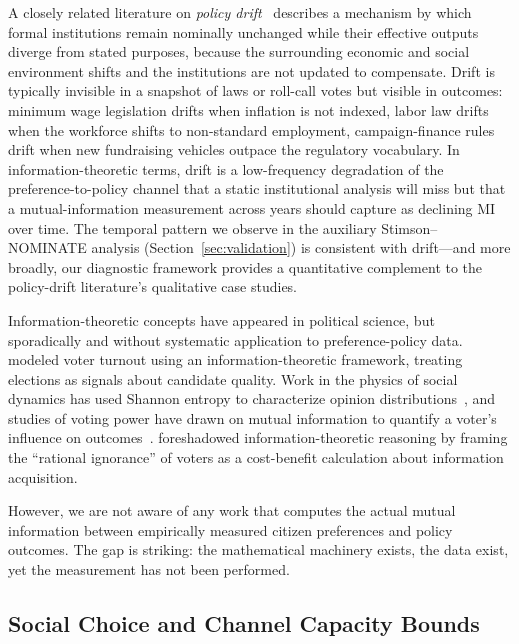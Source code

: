 \documentclass[twocolumn,10pt]{article}
\begin{document}
A closely related literature on \emph{policy drift}~\citep{hacker2004,galvin2020} describes a mechanism by which formal institutions remain nominally unchanged while their effective outputs diverge from stated purposes, because the surrounding economic and social environment shifts and the institutions are not updated to compensate.  Drift is typically invisible in a snapshot of laws or roll-call votes but visible in outcomes: minimum wage legislation drifts when inflation is not indexed, labor law drifts when the workforce shifts to non-standard employment, campaign-finance rules drift when new fundraising vehicles outpace the regulatory vocabulary.  In information-theoretic terms, drift is a low-frequency degradation of the preference-to-policy channel that a static institutional analysis will miss but that a mutual-information measurement across years should capture as declining MI over time.  The temporal pattern we observe in the auxiliary Stimson--NOMINATE analysis (Section~\ref{sec:validation}) is consistent with drift---and more broadly, our diagnostic framework provides a quantitative complement to the policy-drift literature's qualitative case studies.

Information-theoretic concepts have appeared in political science, but sporadically and without systematic application to preference-policy data.  \citet{matsusaka1995} modeled voter turnout using an information-theoretic framework, treating elections as signals about candidate quality.  Work in the physics of social dynamics has used Shannon entropy to characterize opinion distributions~\citep{caticha2015}, and studies of voting power have drawn on mutual information to quantify a voter's influence on outcomes~\citep{kirsch2007}.  \citet{downs1957} foreshadowed information-theoretic reasoning by framing the ``rational ignorance'' of voters as a cost-benefit calculation about information acquisition.

However, we are not aware of any work that computes the actual mutual information between empirically measured citizen preferences and policy outcomes.  The gap is striking: the mathematical machinery exists, the data exist, yet the measurement has not been performed.

\subsection{Social Choice and Channel Capacity Bounds}
\end{document}
